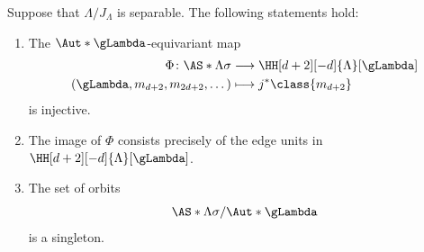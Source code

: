 \documentclass[a4paper]{amsart}
\begin{document}
\begin{theorem}
  \label{thm:final_thm}
  Suppose that $\Lambda/J_\Lambda$ is separable. The following statements hold:
  \begin{enumerate}
  \item\label{it:equivmap_is_injective} The $\Aut*{\gLambda}$-equivariant map
    \begin{align*}
      \Phi\colon\AS*{\Lambda}{\sigma}    & \longrightarrow\HH[d+2][-d]{\Lambda}[\gLambda] \\
      (\gLambda,m_{d+2},m_{2d+2},\dots) & \longmapsto j^*\class{m_{d+2}}
    \end{align*}
    is injective.
  \item\label{it:consists_of_units} The image of $\Phi$ consists precisely of
    the edge units in $\HH[d+2][-d]{\Lambda}[\gLambda]$.
  \item\label{it:is_singleton} The set of orbits
    \[
      \AS*{\Lambda}{\sigma}/\Aut*{\gLambda}
    \]
    is a singleton.
  \end{enumerate}
\end{theorem}
\end{document}
